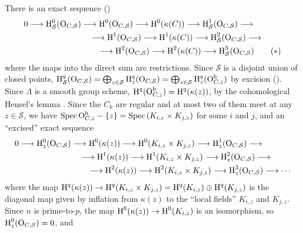 \documentclass{amsart}
\theoremstyle{plain}
\theoremstyle{definition}
\theoremstyle{remark}
\numberwithin{equation}{section}%
\newcommand{\h}{{\text{\rm h}}}
\renewcommand{\H}{{\text{\rm H}}}
\renewcommand{\O}{{\text{\rm O}}}
\renewcommand{\S}{{\mathcal S}}
\newcommand{\Pf}{{\noindent{\it Proof.}\;\;}}
\newcommand{\Spec}{{\text{\rm Spec}\,}}
\begin{document}
\Pf
There is an exact sequence (\cite[III.1.25]{M})
\begin{align*}
0
\longrightarrow \H^0_\S(\O_{C,\S})&\longrightarrow\H^0(\O_{C,\S})\longrightarrow
\H^0(\kappa(C))\longrightarrow\H^1_\S(\O_{C,\S})\longrightarrow\\
&\quad\longrightarrow\H^1(\O_{C,\S})\longrightarrow\H^1(\kappa(C))
\longrightarrow\H^2_\S(\O_{C,\S})\longrightarrow\\
&\qquad\longrightarrow\H^2(\O_{C,\S})\longrightarrow\H^2(\kappa(C))
\longrightarrow\H^3_\S(\O_{C,\S})
\tag{$*$}
\end{align*}
where the maps into the direct sum are restrictions.
Since $\S$ is a disjoint union of closed points,
$\H^q_\S(\O_{C,\S})=\bigoplus_{z\in\S}\H^q_z(\O_{C,\S})=\bigoplus_{z\in \S}\H^q_z(\O_{C,z}^\h)$ 
by excision (\cite[III.1.28, p.93]{M}).
Since $\Lambda$ is a smooth group scheme, $\H^q(\O_{C,z}^\h)=\H^q(\kappa(z))$,
by the cohomological Hensel's lemma \cite[III.3.11(a), p.116]{M}.
Since the $C_k$ are regular and at most two of them meet at any $z\in\S$, 
we have
$\Spec\O_{C,z}^\h-\{z\}=\Spec(K_{i,z}\times K_{j,z})$ for some $i$ and $j$,
and an ``excised'' exact sequence
\begin{align*}
0
\longrightarrow \H^0_z(\O_{C,\S})&\longrightarrow\H^0(\kappa(z))
\longrightarrow\H^0(K_{i,z}\times K_{j,z})\longrightarrow\H^1_z(\O_{C,\S})\longrightarrow\\
&\quad\longrightarrow\H^1(\kappa(z))\longrightarrow 
\H^1(K_{i,z}\times K_{j,z})\longrightarrow\H^2_z(\O_{C,\S})\longrightarrow\\
&\qquad \longrightarrow\H^2(\kappa(z))\longrightarrow \H^2(K_{i,z}\times K_{j,z})\longrightarrow\H^3_z(\O_{C,\S})\longrightarrow\cdots\\
\end{align*}
where the map $\H^q(\kappa(z))\to\H^q(K_{i,z}\times K_{j,z})=
\H^q(K_{i,z})\oplus\H^q(K_{j,z})$ 
is the diagonal map given by inflation from $\kappa(z)$ to the ``local fields'' $K_{i,z}$ and $K_{j,z}$.
Since $n$ is prime-to-$p$, the map $\H^0(\kappa(z))\to\H^0(K_{i,z})$ is an isomorphism,
so $\H^0_z(\O_{C,\S})=0$, and
\end{document}
